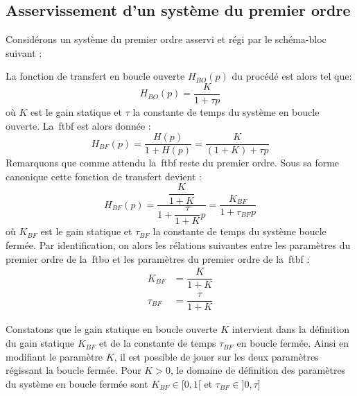 \subsection{Asservissement d'un système du premier ordre}

Considérons un système du premier ordre asservi et régi par le schéma-bloc suivant :
\begin{center}
\end{center}
La fonction de transfert en boucle ouverte $H_{BO}(p)$ du procédé est alors tel que:
$$
H_{BO}(p)=\dfrac{K}{1+\tau p}
$$
où $K$ est le gain statique et $\tau$ la constante de temps 
du système en boucle ouverte. 
La~\gls{ftbf} est alors donnée :
$$
H_{BF}(p)=\dfrac{H(p)}{1+H(p)}=\dfrac{K}{(1+K)+\tau p}
$$
Remarquons que comme attendu la~\gls{ftbf} reste du premier ordre. 
Sous sa forme canonique cette fonction de transfert devient :
$$
H_{BF}(p)=\dfrac{\dfrac{K}{1+K}}{1+\dfrac{\tau}{1+K}p}=\dfrac{K_{BF}}{1+\tau_{BF} p}
$$
où $K_{BF}$ est le gain statique et $\tau_{BF}$ la constante de temps du système boucle fermée.
Par identification, on alors les rélations suivantes entre les paramètres du premier ordre 
de la~\gls{ftbo} et les paramètres du premier ordre de la~\gls{ftbf} :
\begin{align*}
       K_{BF}&=\dfrac{K}{1+K}\\
    \tau_{BF}&=\dfrac{\tau}{1+K}
\end{align*}

Constatons que le gain statique en boucle ouverte $K$ intervient 
dans la définition du gain statique $K_{BF}$ et de la constante de temps $\tau_{BF}$ en boucle fermée. 
Ainsi en modifiant le paramètre $K$, il est possible de jouer sur les deux paramètres régissant la boucle fermée.
Pour $K>0$, le domaine de définition des paramètres du système en boucle fermée sont  $K_{BF}\in[0,1[$ et  $\tau_{BF}\in]0,\tau]$

